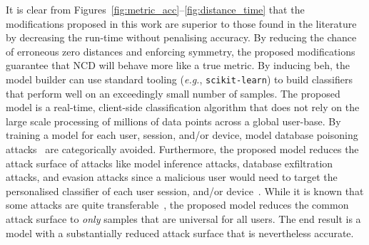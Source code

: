 \documentclass[preprint,12pt]{article}
\begin{document}
It is clear from Figures~\ref{fig:metric_acc}--\ref{fig:distance_time} that the modifications proposed in this work are superior to those found in the literature by decreasing the run-time without penalising accuracy.
By reducing the chance of erroneous zero distances and enforcing symmetry, the proposed modifications guarantee that NCD will behave more like a true metric.
By inducing beh, the model builder can use standard tooling (\textit{e.g.}, \texttt{scikit-learn}) to build classifiers that perform well on an exceedingly small number of samples.
The proposed model is a real-time, client-side classification algorithm that does not rely on the large scale processing of millions of data points across a global user-base.
By training a model for each user, session, and/or device, model database poisoning attacks~\cite{biggio_poisoning_2013} are categorically avoided.
Furthermore, the proposed model reduces the attack surface of attacks like model inference attacks, database exfiltration attacks, and evasion attacks since a malicious user would need to target the personalised classifier of each user session, and/or device~\cite{biggio_evasion_2013,deepfool,chakraborty_adversarial_2018,extraction_attack}.
While it is known that some attacks are quite transferable~\cite{wang2021enhancing}, the proposed model reduces the common attack surface to \textit{only} samples that are universal for all users. 
The end result is a model with a substantially reduced attack surface that is nevertheless accurate.



 

\end{document}
